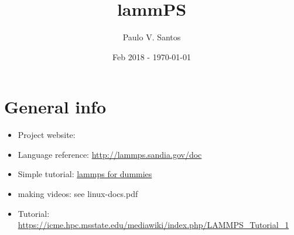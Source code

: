 \documentclass[10pt]{book} %
\def\litdir{x:/sawoptik_databases/jabref}
\def\rootdir{.}
\begin{document}
\selectfont


\title{lammPS}
\author{Paulo V. Santos}
\date{Feb 2018 - \today}

\maketitle



{\let\newpage\relax\tableofcontents}


%




\section{General info}

\begin{itemize}
\item Project website: 
\item Language reference: \href{http://lammps.sandia.gov/doc}{http://lammps.sandia.gov/doc}
\item Simple tutorial: \href{http://wp.df.uba.ar/gebi/wp-content/uploads/sites/9/2016/06/lammps.pdf}{lammps for dummies}
\item making videos: see linux-docs.pdf
\item Tutorial: \href{https://icme.hpc.msstate.edu/mediawiki/index.php/LAMMPS_Tutorial_1}{https://icme.hpc.msstate.edu/mediawiki/index.php/LAMMPS\_Tutorial\_1}
\end{itemize}

\end{document}
